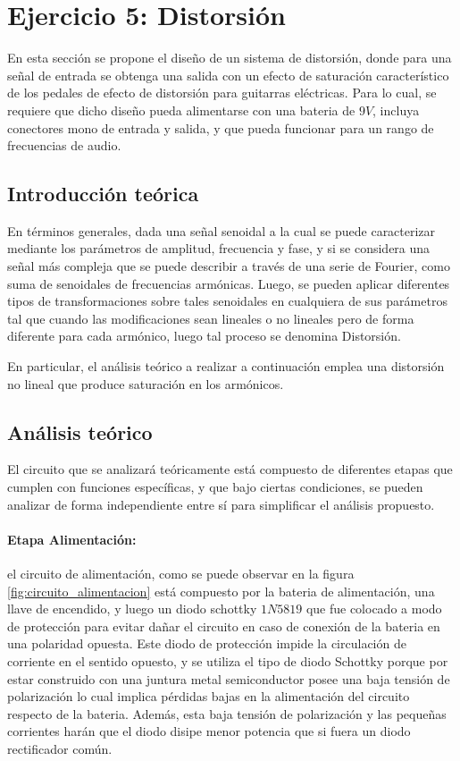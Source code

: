 \section{Ejercicio 5: Distorsi\'on}
En esta secci\'on se propone el dise\~no de un sistema de distorsi\'on, donde para una se\~nal de entrada se obtenga una salida
con un efecto de saturaci\'on caracter\'istico de los pedales de efecto de distorsi\'on para guitarras el\'ectricas. Para lo cual,
se requiere que dicho dise\~no pueda alimentarse con una bateria de $9V$, incluya conectores mono de entrada y salida, y que pueda funcionar para un rango
de frecuencias de audio.

\subsection{Introducci\'on te\'orica}
En t\'erminos generales, dada una se\~nal senoidal a la cual se puede caracterizar mediante los par\'ametros de amplitud, frecuencia y fase,
y si se considera una se\~nal m\'as compleja que se puede describir a trav\'es de una serie de Fourier, como suma de senoidales de frecuencias arm\'onicas. Luego, 
se pueden aplicar diferentes tipos de transformaciones sobre tales senoidales en cualquiera de sus par\'ametros tal
que cuando las modificaciones sean lineales o no lineales pero de forma diferente para cada arm\'onico, luego tal proceso se denomina Distorsi\'on.

En particular, el an\'alisis te\'orico a realizar a continuaci\'on emplea una distorsi\'on no lineal que produce saturaci\'on en los arm\'onicos.

\subsection{An\'alisis te\'orico}
El circuito que se analizar\'a te\'oricamente est\'a compuesto de diferentes etapas que cumplen con funciones
espec\'ificas, y que bajo ciertas condiciones, se pueden analizar de forma independiente entre s\'i para simplificar el an\'alisis propuesto.

\paragraph*{Etapa Alimentaci\'on:} el circuito de alimentaci\'on, como se puede observar en la figura \ref{fig:circuito_alimentacion}
est\'a compuesto por la bateria de alimentaci\'on, una llave de encendido, y luego un diodo schottky $1N5819$ que fue colocado a modo de protecci\'on
para evitar da\~nar el circuito en caso de conexi\'on de la bateria en una polaridad opuesta. Este diodo de protecci\'on impide la circulaci\'on de corriente
en el sentido opuesto, y se utiliza el tipo de diodo Schottky porque por estar construido con una juntura metal semiconductor posee una baja tensi\'on de polarizaci\'on
lo cual implica p\'erdidas bajas en la alimentaci\'on del circuito respecto de la bateria. Adem\'as, esta baja tensi\'on de polarizaci\'on y las peque\~nas corrientes har\'an que
el diodo disipe menor potencia que si fuera un diodo rectificador com\'un.

